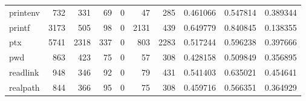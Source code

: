 \begin{tabular}{lrrrrrrrrr}
printenv  &                                                732 &                                                331 &                                                 69 &                                                  0 &                                                 47 &                                                285 &                                           0.461066 &                               0.547814 &                             0.389344 \\
printf    &                                               3173 &                                                505 &                                                 98 &                                                  0 &                                               2131 &                                                439 &                                           0.649779 &                               0.840845 &                             0.138355 \\
ptx       &                                               5741 &                                               2318 &                                                337 &                                                  0 &                                                803 &                                               2283 &                                           0.517244 &                               0.596238 &                             0.397666 \\
pwd       &                                                863 &                                                423 &                                                 75 &                                                  0 &                                                 57 &                                                308 &                                           0.428158 &                               0.509849 &                             0.356895 \\
readlink  &                                                948 &                                                346 &                                                 92 &                                                  0 &                                                 79 &                                                431 &                                           0.541403 &                               0.635021 &                             0.454641 \\
realpath  &                                                844 &                                                366 &                                                 95 &                                                  0 &                                                 75 &                                                308 &                                           0.459716 &                               0.566351 &                             0.364929 \\

\end{tabular}
